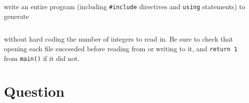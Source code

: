 write an entire program (including \texttt{#include} directives and
\texttt{using} statements) to generate

\inputminted[label={file-io-output.gen.txt}]{text}{\docCodeDir/file-io-output.gen.txt}

without hard coding the number of integers to read in.  Be sure to check that
opening each file succeeded before reading from or writing to it, and
\texttt{return 1} from \texttt{main()} if it did not.

\newpage

\textQuestion{\makePageQuadrilleRuled}


\newpage

\section{Question}

